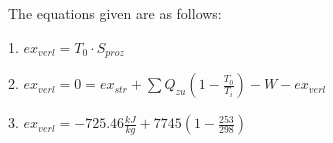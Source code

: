 The equations given are as follows:

1. \( ex_{verl} = T_0 \cdot S_{proz} \)

2. \( ex_{verl} = 0 = ex_{str} + \sum Q_{zu} \left( 1 - \frac{T_0}{T_i} \right) - W - ex_{verl} \)

3. \( ex_{verl} = -725.46 \frac{kJ}{kg} + 7745 \left( 1 - \frac{253}{298} \right) \)